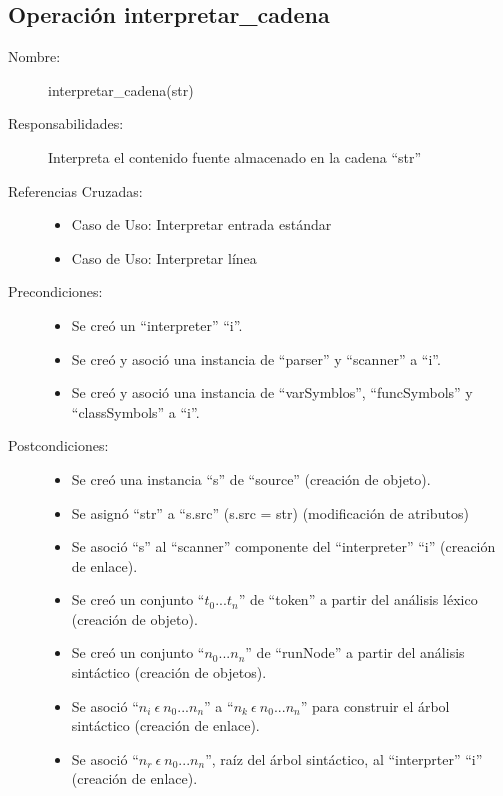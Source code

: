 \subsection{Operación interpretar\_cadena}
\FloatBarrier
\begin{framed}
	\begin{description}
		\item [Nombre:] interpretar\_cadena(str)
		\item [Responsabilidades:] Interpreta el contenido fuente almacenado en la cadena ``str''
		\item [Referencias Cruzadas: ] \hfill
      \begin {itemize}
      \item Caso de Uso: Interpretar entrada estándar 
      \item Caso de Uso: Interpretar línea
      \end{itemize}
      \item [Precondiciones:] \hfill
      \begin {itemize}
      \item Se creó un ``interpreter'' ``i''.
      \item Se creó y asoció una instancia de ``parser'' y ``scanner'' a ``i''.
      \item Se creó y asoció una instancia de ``varSymblos'', ``funcSymbols'' y ``classSymbols'' a ``i''.
      \end{itemize}
      \item [Postcondiciones:] \hfill
      \begin {itemize}
         \item Se creó una instancia ``s'' de ``source'' (creación de objeto).
         \item Se asignó ``str'' a ``s.src'' (s.src = str) (modificación de atributos)
         \item Se asoció ``s'' al ``scanner'' componente del ``interpreter'' ``i'' (creación de enlace). 
         \item Se creó un conjunto ``$t_0...t_n$'' de ``token'' a partir del análisis léxico (creación de objeto).
         \item Se creó un conjunto ``$n_0...n_n$'' de ``runNode'' a partir del análisis sintáctico (creación de objetos).
         \item Se asoció ``$n_i\ \epsilon\ n_0...n_n$'' a ``$n_k\ \epsilon\ n_0...n_n$'' para construir el árbol sintáctico (creación de enlace).
         \item Se asoció  ``$n_r\ \epsilon\ n_0...n_n$'', raíz del árbol sintáctico, al ``interprter'' ``i'' (creación de enlace).

\end{itemize}
\end{description}
\end{framed}
